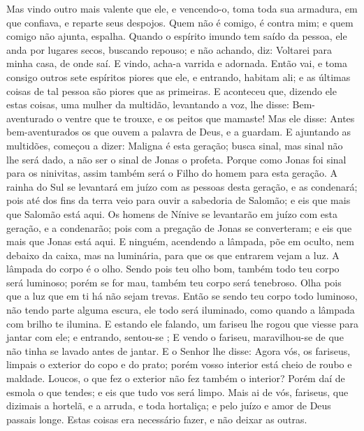 {  Mas vindo outro mais valente que ele, e vencendo-o, toma
{} toda sua armadura, em que confiava, e reparte seus despojos.
  Quem não é comigo, é contra mim; e quem comigo não ajunta, espalha.
  Quando o espírito imundo tem saído da pessoa, ele anda por lugares secos, buscando repouso; e não
{} achando, diz: Voltarei para minha casa, de onde saí.
  E vindo, acha-a varrida e adornada.
  Então vai, e toma consigo outros sete espíritos piores que ele, e entrando, habitam ali; e as últimas coisas de tal pessoa são piores que as primeiras.
  E aconteceu que, dizendo ele estas coisas, uma mulher da multidão, levantando a voz, lhe disse: Bem-aventurado o ventre que te trouxe, e os peitos que mamaste!
  Mas ele disse: Antes bem-aventurados os que ouvem a palavra de Deus, e a guardam.
  E ajuntando as multidões, começou a dizer: Maligna é esta geração; busca sinal, mas sinal não lhe será dado, a não ser o sinal de Jonas o profeta.
  Porque como Jonas foi sinal para os ninivitas, assim também será o Filho do homem para esta geração.
  A rainha do Sul se levantará em juízo com as pessoas desta geração, e as condenará; pois até dos fins da terra veio para ouvir a sabedoria de Salomão; e eis que mais que Salomão está aqui.
  Os homens de Nínive se levantarão em juízo com esta geração, e a condenarão; pois com a pregação de Jonas se converteram; e eis que mais que Jonas está aqui.
  E ninguém, acendendo a lâmpada,
{} põe em
{} oculto, nem debaixo da caixa, mas na luminária, para que os que entrarem vejam a luz.
  A lâmpada do corpo é o olho. Sendo pois teu olho bom, também todo teu corpo será luminoso; porém se for mau, também
{} teu corpo será tenebroso.
  Olha pois que a luz que em ti há não sejam trevas.
  Então se sendo teu corpo todo luminoso, não tendo parte alguma escura, ele todo será iluminado, como quando a lâmpada com
{} brilho te ilumina.
  E estando ele
{} falando, um fariseu lhe rogou que viesse para jantar com ele; e entrando, sentou-se
{} ;
  E vendo
{} o fariseu, maravilhou-se de que não tinha se lavado antes de jantar.
  E o Senhor lhe disse: Agora vós, os fariseus, limpais o exterior do copo e do prato; porém vosso interior está cheio de roubo e maldade.
  Loucos, o que fez o exterior não fez também o interior?
  Porém daí de esmola o que tendes; e eis que tudo vos será limpo.
  Mais ai de vós, fariseus, que dizimais a hortelã, e a arruda, e toda hortaliça; e pelo juízo e amor de Deus passais longe. Estas coisas era necessário fazer, e não deixar as outras.
}
